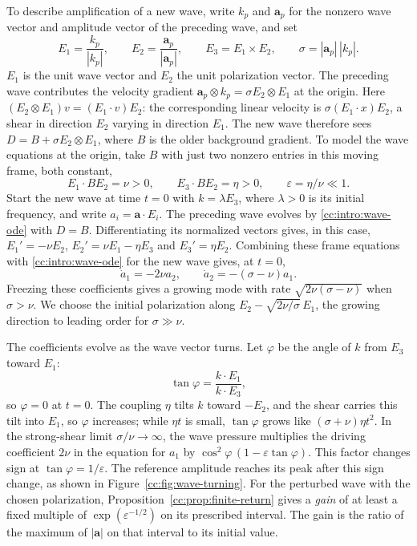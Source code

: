 To describe amplification of a new wave, write $k_p$ and $\mathbf a_p$
for the nonzero wave vector and amplitude vector of the preceding wave,
and set
\[
 E_1=\frac{k_p}{|k_p|},\qquad
 E_2=\frac{\mathbf a_p}{|\mathbf a_p|},\qquad E_3=E_1\times E_2,
 \qquad \sigma=|\mathbf a_p|\,|k_p|.
\]
$E_1$ is the unit wave vector and $E_2$ the unit polarization vector.
The preceding wave contributes the velocity gradient
$\mathbf a_p\otimes k_p=\sigma E_2\otimes E_1$ at the origin.
Here $(E_2\otimes E_1)v=(E_1\cdot v)E_2$: the corresponding linear
velocity is $\sigma(E_1\cdot x)E_2$, a shear in direction $E_2$
varying in direction $E_1$. The new wave therefore sees
$D=B+\sigma E_2\otimes E_1$, where $B$ is the older background gradient.
To model the wave equations at the origin, take $B$ with just two
nonzero entries in this moving frame, both constant,
\[
 E_1\cdot BE_2=\nu>0,\qquad E_3\cdot BE_2=\eta>0,
 \qquad \varepsilon=\eta/\nu\ll1.
\]
Start the new wave at time $t=0$ with $k=\lambda E_3$, where $\lambda>0$
is its initial frequency, and write $a_i=\mathbf a\cdot E_i$. The
preceding wave evolves by \eqref{cc:intro:wave-ode} with $D=B$.
Differentiating its normalized vectors gives, in this case,
$E_1'=-\nu E_2$, $E_2'=\nu E_1-\eta E_3$ and $E_3'=\eta E_2$.
Combining these frame equations with \eqref{cc:intro:wave-ode} for the
new wave gives, at $t=0$,
\[
 \dot a_1=-2\nu a_2,\qquad
 \dot a_2=-(\sigma-\nu)a_1.
\]
Freezing these coefficients gives a growing mode with rate
$\sqrt{2\nu(\sigma-\nu)}$ when $\sigma>\nu$. We choose the initial
polarization along $E_2-\sqrt{2\nu/\sigma}\,E_1$, the growing direction
to leading order for $\sigma\gg\nu$.

The coefficients evolve as the wave vector turns. Let $\varphi$
be the angle of $k$ from $E_3$ toward $E_1$:
\[
 \tan\varphi=\frac{k\cdot E_1}{k\cdot E_3},
\]
so $\varphi=0$ at $t=0$. The coupling $\eta$ tilts $k$ toward $-E_2$,
and the shear carries this tilt into $E_1$, so $\varphi$ increases;
while $\eta t$ is small, $\tan\varphi$ grows like $(\sigma+\nu)\eta t^2$.
In the strong-shear limit $\sigma/\nu\to\infty$, the wave pressure
multiplies the driving coefficient $2\nu$ in the equation for $a_1$ by
$\cos^2\varphi\,(1-\varepsilon\tan\varphi)$. This factor changes sign
at $\tan\varphi=1/\varepsilon$. The reference amplitude reaches its peak
after this sign change, as shown in Figure~\ref{cc:fig:wave-turning}.
For the perturbed wave with the chosen polarization,
Proposition~\ref{cc:prop:finite-return} gives a \emph{gain} of at least
a fixed multiple of $\exp(\varepsilon^{-1/2})$ on its prescribed interval.
The gain is the ratio of the maximum of $|\mathbf a|$ on that interval
to its initial value.


